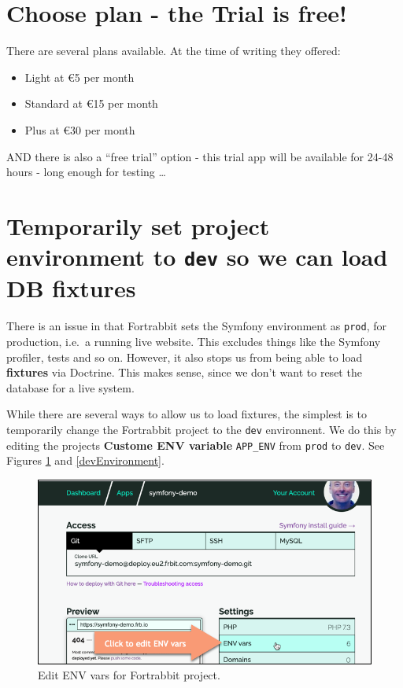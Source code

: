 \documentclass[a4paperpaper,openright]{book}
\providecommand{\tightlist}{%
  \setlength{\itemsep}{0pt}\setlength{\parskip}{0pt}}
\begin{document}
\hypertarget{choose-plan---the-trial-is-free}{%
\section{Choose plan - the Trial is
free!}\label{choose-plan---the-trial-is-free}}

There are several plans available. At the time of writing they offered:

\begin{itemize}
\tightlist
\item
  Light at €5 per month
\item
  Standard at €15 per month
\item
  Plus at €30 per month
\end{itemize}

AND there is also a ``free trial'' option - this trial app will be
available for 24-48 hours - long enough for testing \ldots{}

\hypertarget{temporarily-set-project-environment-to-dev-so-we-can-load-db-fixtures}{%
\section{\texorpdfstring{Temporarily set project environment to
\texttt{dev} so we can load DB
fixtures}{Temporarily set project environment to dev so we can load DB fixtures}}\label{temporarily-set-project-environment-to-dev-so-we-can-load-db-fixtures}}

There is an issue in that Fortrabbit sets the Symfony environment as
\texttt{prod}, for production, i.e.~a running live website. This
excludes things like the Symfony profiler, tests and so on. However, it
also stops us from being able to load \textbf{fixtures} via Doctrine.
This makes sense, since we don't want to reset the database for a live
system.

While there are several ways to allow us to load fixtures, the simplest
is to temporarily change the Fortrabbit project to the \texttt{dev}
environnent. We do this by editing the projects \textbf{Custome ENV
variable} \texttt{APP\_ENV} from \texttt{prod} to \texttt{dev}. See
Figures \ref{editEnv} and \ref{devEnvironment}.

\begin{figure}
\centering
\includegraphics{./tex2pdf.-5a4428120ede4be1/95149fc53c4e728e7b82aea00b5ceba9c8bbe42e.png}
\caption{Edit ENV vars for Fortrabbit project.\label{editEnv}}
\end{figure}
\end{document}

